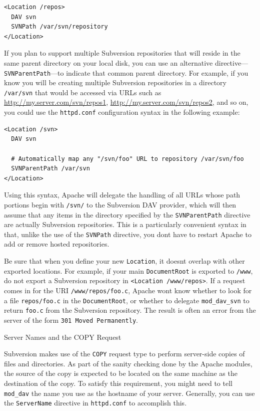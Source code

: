 \begin{verbatim}
<Location /repos>
  DAV svn
  SVNPath /var/svn/repository
</Location>
\end{verbatim}

If you plan to support multiple Subversion repositories that will reside
in the same parent directory on your local disk, you can use an
alternative directive---\texttt{SVNParentPath}---to indicate that common
parent directory. For example, if you know you will be creating multiple
Subversion repositories in a directory \texttt{/var/svn} that would be
accessed via URLs such as \url{http://my.server.com/svn/repos1},
\url{http://my.server.com/svn/repos2}, and so on, you could use the
\texttt{httpd.conf} configuration syntax in the following example:

\begin{verbatim}
<Location /svn>
  DAV svn

  # Automatically map any "/svn/foo" URL to repository /var/svn/foo
  SVNParentPath /var/svn
</Location>
\end{verbatim}

Using this syntax, Apache will delegate the handling of all URLs whose
path portions begin with \texttt{/svn/} to the Subversion DAV provider,
which will then assume that any items in the directory specified by the
\texttt{SVNParentPath} directive are actually Subversion repositories.
This is a particularly convenient syntax in that, unlike the use of the
\texttt{SVNPath} directive, you don\textquotesingle t have to restart
Apache to add or remove hosted repositories.

Be sure that when you define your new \texttt{Location}, it
doesn\textquotesingle t overlap with other exported locations. For
example, if your main \texttt{DocumentRoot} is exported to
\texttt{/www}, do not export a Subversion repository in
\texttt{\textless{}Location\ /www/repos\textgreater{}}. If a request
comes in for the URI \texttt{/www/repos/foo.c}, Apache
won\textquotesingle t know whether to look for a file
\texttt{repos/foo.c} in the \texttt{DocumentRoot}, or whether to
delegate \texttt{mod\_dav\_svn} to return \texttt{foo.c} from the
Subversion repository. The result is often an error from the server of
the form \texttt{301\ Moved\ Permanently}.

Server Names and the COPY Request

Subversion makes use of the \texttt{COPY} request type to perform
server-side copies of files and directories. As part of the sanity
checking done by the Apache modules, the source of the copy is expected
to be located on the same machine as the destination of the copy. To
satisfy this requirement, you might need to tell \texttt{mod\_dav} the
name you use as the hostname of your server. Generally, you can use the
\texttt{ServerName} directive in \texttt{httpd.conf} to accomplish this.


